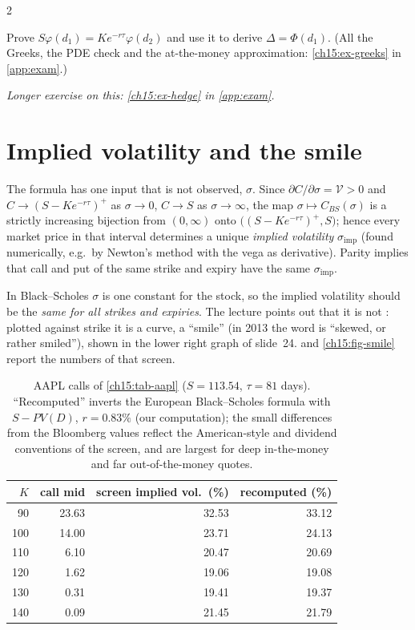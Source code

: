 \begin{paracol}{2}
\begin{exercise}\label{ch15:ex-greeks-short}
Prove $S\varphi(d_1)=Ke^{-r\tau}\varphi(d_2)$ and use it to derive $\Delta=\Phi(d_1)$. (All the Greeks, the PDE check and the at-the-money approximation: \cref{ch15:ex-greeks} in \cref{app:exam}.)
\end{exercise}

\noindent\emph{Longer exercise on this: \cref{ch15:ex-hedge} in \cref{app:exam}.}

\section{Implied volatility and the smile}\label{ch15:sec-smile}
The formula has one input that is not observed, $\sigma$. Since $\partial C/\partial\sigma=\mathcal V>0$ and $C\to(S-Ke^{-r\tau})^+$ as $\sigma\to0$, $C\to S$ as $\sigma\to\infty$, the map $\sigma\mapsto C_{BS}(\sigma)$ is a strictly increasing
bijection from $(0,\infty)$ onto $\bigl((S-Ke^{-r\tau})^+,S\bigr)$; hence every market price in that interval determines a unique \emph{implied volatility} $\sigma_{\mathrm{imp}}$ (found numerically, e.g.\ by Newton's method with the vega as derivative). Parity implies that call and put
of the same strike and expiry have the same $\sigma_{\mathrm{imp}}$.

In Black--Scholes $\sigma$ is one constant for the stock, so the implied volatility should be the \emph{same for all strikes and expiries}. The lecture points out that it is not
: plotted against strike it is a curve, a ``smile'' (in 2013 the word is ``skewed, or rather smiled''), shown in the lower right graph of slide~24.  and
\cref{ch15:fig-smile} report the numbers of that screen.

\begin{table}[ht]
\centering\small
\begin{tabular}{r r r r}
\toprule
$K$ & call mid & screen implied vol.\ (\%) & recomputed (\%)\\
\midrule
90 & 23.63 & 32.53 & 33.12\\
100 & 14.00 & 23.71 & 24.13\\
110 & 6.10 & 20.47 & 20.69\\
120 & 1.62 & 19.06 & 19.08\\
130 & 0.31 & 19.41 & 19.37\\
140 & 0.09 & 21.45 & 21.79\\
\bottomrule
\end{tabular}
\caption{AAPL calls of \cref{ch15:tab-aapl} ($S=113.54$, $\tau=81$ days). ``Recomputed'' inverts the European Black--Scholes formula with $S-PV(D)$, $r=0.83\%$ (our computation); the small differences from the Bloomberg values reflect the
American-style and dividend conventions of the screen, and are largest for deep in-the-money and far out-of-the-money quotes.}\label{ch15:tab-smile}
\end{table}


\end{paracol}
